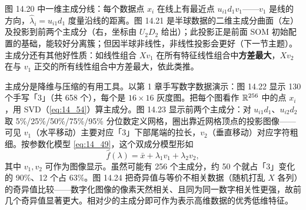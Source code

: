 \begin{remark}[主成分的性质与解释]
图 14.20 中一维主成分线：每个数据点 $x_i$ 在线上有最近点 $u_{i1}d_1v_1$——$v_1$ 是线的方向，$\hat\lambda_i=u_{i1}d_1$ 度量沿线的距离。图 14.21 是半球数据的二维主成分曲面（左）及投影到前两个主成分（右，坐标由 $U_2D_2$ 给出）；此投影正是前面 SOM 初始配置的基础，能较好分离簇；但因半球非线性，非线性投影会更好（下一节主题）。主成分还有其他好性质：如线性组合 $Xv_1$ 在所有特征线性组合中\textbf{方差最大}，$Xv_2$ 在与 $v_1$ 正交的所有线性组合中方差最大，依此类推。
\end{remark}

\begin{example}[手写数字]
主成分是降维与压缩的有用工具。以第 1 章手写数字数据演示：图 14.22 显示 130 个手写「3」（共 658 个），每个是 $16\times 16$ 灰度图。把每个图看作 $\mathbb{R}^{256}$ 中的点 $x_i$，用 SVD（\eqref{eq:14_54}）算主成分。图 14.23 显示前两个主成分：对 $u_{i1}d_1$、$u_{i2}d_2$ 取 5\%/25\%/50\%/75\%/95\% 分位数定义网格，圈出靠近网格顶点的投影图像——可见 $v_1$（水平移动）主要对应「3」下部尾端的拉长，$v_2$（垂直移动）对应字符粗细。按参数化模型 \eqref{eq:14_49}，这个双成分模型形如
\begin{equation}
\hat f(\lambda) = \bar x + \lambda_1 v_1 + \lambda_2 v_2, \label{eq:14_55}
\end{equation}
其中 $v_1,v_2$ 可作为图像显示。虽然可能有 256 个主成分，约 50 个就占「3」变化的 90\%、12 个占 63\%。图 14.24 把奇异值与等价不相关数据（随机打乱 $X$ 各列）的奇异值比较——数字化图像的像素天然相关、且同为同一数字相关性更强，故前几个奇异值显著更大。相对少的主成分即可作为表示高维数据的优秀低维特征。
\end{example}

